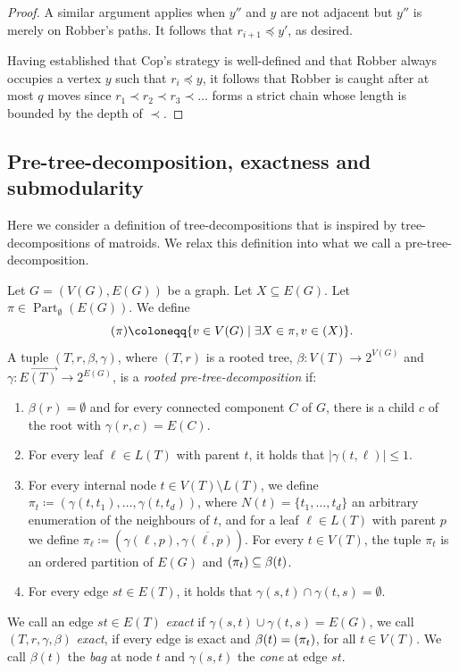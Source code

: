 \documentclass{lmcs}
\theoremstyle{plain}\newtheorem{claim}[thm]{Claim}   %
\DeclareMathOperator{\partitions}{Part}
\newcommand{\partitionsEmpty}{\ensuremath{\partitions_\emptyset}}
\newcommand{\complementOf}[1]{\ensuremath{\overline{#1}}}
\let\boundary\relax
\newcommand{\boundary}{\Delta}
\newcommand{\preTreeDec}{pre-tree-decomposition}
\newcommand{\PreTreeDec}{Pre-tree-decomposition}
\begin{document}
\begin{proof}
	A similar argument applies when $y''$ and $y$ are not adjacent but $y''$ is merely on Robber's paths.
	It follows that $r_{i+1} \preceq y'$, as desired.
	
	Having established that Cop's strategy is well-defined and that Robber always occupies a vertex $y$ such that $r_i \preceq y$,
	it follows that Robber is caught after at most $q$ moves since $r_1 \prec r_2 \prec r_3 \prec \dots$ forms a strict chain whose length is bounded by the depth of $\prec$.
\end{proof}

\subsection{\PreTreeDec, exactness and submodularity}\label{sec:predec}

Here we consider a definition of tree-decompositions that is inspired by tree-decompositions of matroids.
We relax this definition into what we call a \preTreeDec.

\begin{defi}
	Let $G=(V(G),E(G))$ be a graph.
	Let $X\subseteq E(G)$.
	Let $\pi\in\partitionsEmpty(E(G))$.
	We define
	\[
	\boundary(\pi)\coloneqq\{v\in V(G)\mid \exists X\in \pi, v\in\boundary(X) \}.
	\]
	A tuple $(T,r,\beta,\gamma)$, where $(T,r)$ is a rooted tree, $\beta\colon V(T)\rightarrow 2^{V(G)}$ and $\gamma\colon \overrightarrow{E(T)}\rightarrow 2^{E(G)}$, is a \emph{rooted \preTreeDec} if:
	\begin{enumerate}[label=(PD.\arabic*), labelindent=0pt, itemindent=*, leftmargin=*]
		\item $\beta(r)=\emptyset$ and for every connected component $C$ of $G$, there is a child $c$ of the root with $\gamma(r,c)=E(C)$.\label{ax:preTreeRoot}
		\item For every leaf $\ell\in L(T)$ with parent $t$, it holds that $|\gamma(t,\ell)|\leq 1$.\label{ax:preTreeLeaf}
		\item For every internal node $t\in V(T)\setminus L(T)$, we define $\pi_t\coloneqq(\gamma(t,t_1),\ldots,\gamma(t,t_d))$, where $N(t)=\{t_1,\ldots,t_d\}$ an arbitrary enumeration of the neighbours of $t$, and for a leaf $\ell \in L(T)$ with parent $p$ we define $\pi_\ell\coloneqq(\gamma(\ell,p),\complementOf{\gamma(\ell,p)})$.
		For every $t\in V(T)$, the tuple $\pi_t$ is an ordered partition of $E(G)$ and $\boundary(\pi_t)\subseteq \beta(t)$.\label{ax:preTreePart}
		\item For every edge $st\in E(T)$, it holds that $\gamma(s,t)\cap \gamma(t,s) = \emptyset$.\label{ax:preTreeEdge}
	\end{enumerate}
	We call an edge $st\in E(T)$ \emph{exact} if $\gamma(s,t)\cup\gamma(t,s)=E(G)$, we call $(T,r,\gamma,\beta)$ \emph{exact}, if every edge is exact and $\beta(t)= \boundary(\pi_t)$, for all $t\in V(T)$.
	We call $\beta(t)$ the \emph{bag} at node $t$ and $\gamma(s,t)$ the \emph{cone} at edge $st$.
\end{defi}
\end{document}
